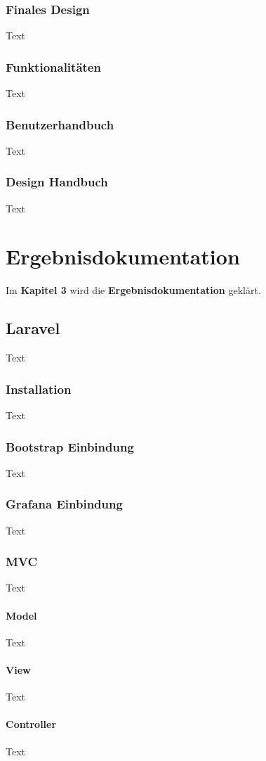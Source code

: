 \subsection{Finales Design}
Text
\subsection{Funktionalitäten }
Text
\subsection{Benutzerhandbuch}
Text
\subsection{Design Handbuch}
Text






\chapter{Ergebnisdokumentation }
Im \textbf{Kapitel 3} wird die \textbf{Ergebnisdokumentation} geklärt.

\section{Laravel }
Text
\subsection{Installation}
Text
\subsection{Bootstrap Einbindung}
Text
\subsection{Grafana Einbindung}
Text
\subsection{MVC}
Text
\subsubsection{Model}
Text
\subsubsection{View}
Text
\subsubsection{Controller}
Text

